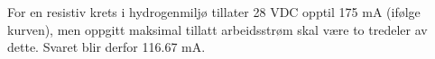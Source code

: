 \vskip 10pt

For en resistiv krets i hydrogenmiljø tillater 28 VDC opptil 175 mA (ifølge kurven), men oppgitt maksimal tillatt arbeidsstrøm skal være to tredeler av dette. Svaret blir derfor 116.67 mA.



